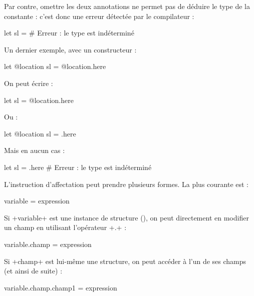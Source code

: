 Par contre, omettre les deux annotations ne permet pas de déduire le type de la constante : c'est donc une erreur détectée par le compilateur :
\begin{galgas}
let sl = {} # Erreur : le type est indéterminé
\end{galgas}

Un dernier exemple, avec un constructeur :
\begin{galgas}
let @location sl = @location.here
\end{galgas}

On peut écrire :
\begin{galgas}
let sl = @location.here
\end{galgas}

Ou :
\begin{galgas}
let @location sl = .here
\end{galgas}

Mais en aucun cas :
\begin{galgas}
let sl = .here # Erreur : le type est indéterminé
\end{galgas}




















L'instruction d'affectation peut prendre plusieurs formes. La plus courante est :

\begin{galgas}
variable = expression
\end{galgas}

Si \ggs+variable+ est une instance de structure (), on peut directement en modifier un champ en utilisant l'opérateur \ggs+.+ :

\begin{galgas}
variable.champ = expression
\end{galgas}

Si \ggs+champ+ est lui-même une structure, on peut accéder à l'un de ses champs (et ainsi de suite) :

\begin{galgas}
variable.champ.champ1 = expression
\end{galgas}













